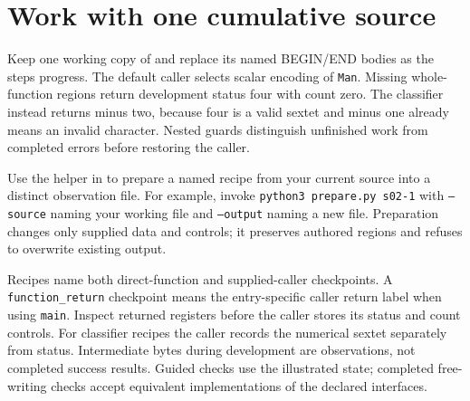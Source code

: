\section{Work with one cumulative source}
Keep one working copy of  and replace its
named BEGIN/END bodies as the steps progress. The default caller selects scalar
encoding of \texttt{Man}. Missing whole-function regions return development status four
with count zero. The classifier instead returns minus two, because four is a valid
sextet and minus one already means an invalid character. Nested guards distinguish
unfinished work from completed errors before restoring the caller.

Use the helper in  to prepare a named recipe from your
current source into a distinct observation file. For example, invoke
\texttt{python3 prepare.py s02-1} with \texttt{--source} naming your working file and
\texttt{--output} naming a new file. Preparation changes only supplied data and controls;
it preserves authored regions and refuses to overwrite existing output.

Recipes name both direct-function and supplied-caller checkpoints. A
\texttt{function\_return} checkpoint means the entry-specific caller return label when
using \texttt{main}. Inspect returned registers before the caller stores its status and
count controls. For classifier recipes the caller records the numerical sextet separately
from status. Intermediate bytes during development are observations, not completed
success results. Guided checks use the illustrated state; completed free-writing checks
accept equivalent implementations of the declared interfaces.

